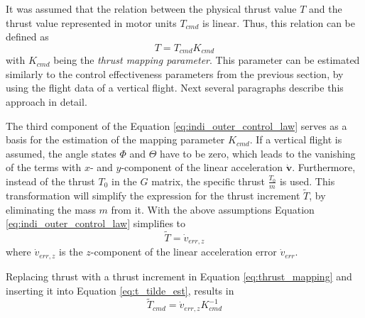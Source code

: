 \documentclass[11pt, a4paper, twoside]{report}
\begin{document}
It was assumed that the relation between the physical thrust value $T$ and the thrust value represented in motor units $T_{cmd}$ is linear. Thus, this relation can be defined as
\begin{equation}
	T = T_{cmd} K_{cmd}
	\label{eq:thrust_mapping}
\end{equation}
with $K_{cmd}$ being the \textit{thrust mapping parameter}. This parameter can be estimated similarly to the control effectiveness parameters from the previous section, by using the flight data of a vertical flight. Next several paragraphs describe this approach in detail.  

The third component of the Equation \ref{eq:indi_outer_control_law} serves as a basis for the estimation of the mapping parameter $K_{cmd}$. If a vertical flight is assumed, the angle states $\Phi$ and $\Theta$ have to be zero, which leads to the vanishing of the terms with $x$- and $y$-component of the linear acceleration $\bm{\dot{v}}$. Furthermore, instead of the thrust $T_0$ in the $G$ matrix, the specific thrust $\frac{T_0}{m}$ is used. This transformation will simplify the expression for the thrust increment $\tilde{T}$, by eliminating the mass $m$ from it. With the above assumptions Equation \ref{eq:indi_outer_control_law}  simplifies to 
\begin{equation}
	\tilde{T} = \dot{v}_{err,z}
	\label{eq:t_tilde_est}
\end{equation}
where $\dot{v}_{err,z}$ is the $z$-component of the linear acceleration error $\dot{v}_{err}$.

Replacing thrust with a thrust increment in Equation \ref{eq:thrust_mapping} and inserting it into Equation \ref{eq:t_tilde_est}, results in
\begin{equation}
	\tilde{T}_{cmd} = \dot{v}_{err,z} K_{cmd}^{-1}
	\label{eq:t_tilde_est_cmd}
\end{equation}
\end{document}
